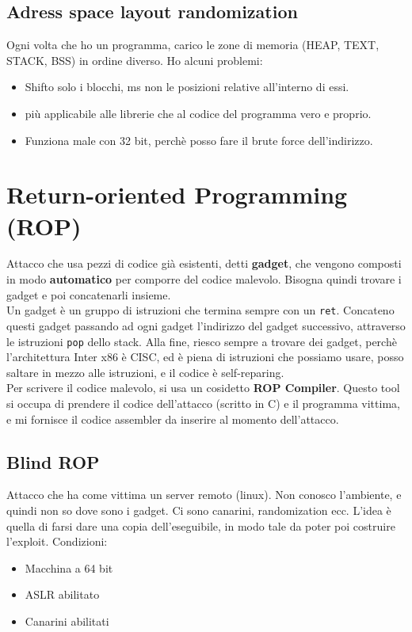 \documentclass[a4paper,12pt]{article}
\begin{document}
\subsection{Adress space layout randomization}
Ogni volta che ho un programma, carico le zone di memoria (HEAP, TEXT, STACK, BSS) in ordine diverso. Ho alcuni problemi:
\begin{itemize}
\item Shifto solo i blocchi, ms non le posizioni relative all'interno di essi.
\item \E più applicabile alle librerie che al codice del programma vero e proprio.
\item Funziona male con 32 bit, perchè posso fare il brute force dell'indirizzo.
\end{itemize}

\section{Return-oriented Programming (ROP)}
Attacco che usa pezzi di codice già esistenti, detti \textbf{gadget}, che vengono composti in modo \textbf{automatico} per comporre del codice malevolo. Bisogna quindi trovare i gadget e poi concatenarli insieme.\\
Un gadget è un gruppo di istruzioni che termina sempre con un \texttt{ret}. Concateno questi gadget passando ad ogni gadget l'indirizzo del gadget successivo, attraverso le istruzioni \texttt{pop} dello stack. Alla fine, riesco sempre a trovare dei gadget, perchè l'architettura Inter x86 è CISC, ed è piena di istruzioni che possiamo usare, posso saltare in mezzo alle istruzioni, e il codice è self-reparing.\\
Per scrivere il codice malevolo, si usa un cosidetto \textbf{ROP Compiler}. Questo tool si occupa di prendere il codice dell'attacco (scritto in C) e il programma vittima, e mi fornisce il codice assembler da inserire al momento dell'attacco.

\subsection{Blind ROP}
Attacco che ha come vittima un server remoto (linux). Non conosco l'ambiente, e quindi non so dove sono i gadget. Ci sono canarini, randomization ecc. L'idea è quella di farsi dare una copia dell'eseguibile, in modo tale da poter poi costruire  l'exploit.
Condizioni:
\begin{itemize}
\item Macchina a 64 bit
\item ASLR abilitato
\item Canarini abilitati
\end{itemize}
\end{document}
